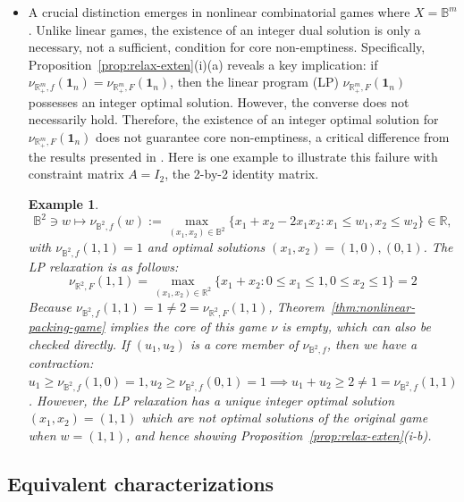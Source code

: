 \documentclass[11pt]{article}\usepackage[]{graphicx}\usepackage[]{xcolor}
\newtheorem{example}{Example}
\begin{document}
\begin{itemize}
Now Theorem~\ref{thm:nonlinear-partition-game} can be invoked to imply the Bondareva-Shapley theorem~\citep[Lemma 1]{shapley1967balanced}. 


\item A crucial distinction emerges in nonlinear combinatorial games where $X=\mathbb{B}^m$. Unlike linear games, the existence of an integer dual solution is only a necessary, not a sufficient, condition for core non-emptiness. Specifically, Proposition~\ref{prop:relax-exten}(i)(a) reveals a key implication: if $\nu_{\mathbb{R}^m_{+}, f}\left(\mathbf{1}_n\right)=\nu_{\mathbb{R}^m_{+}, F}\left(\mathbf{1}_n\right)$, then the linear program (LP) $\nu_{\mathbb{R}^m_{+}, F}\left(\mathbf{1}_n\right)$ possesses an integer optimal solution. However, the converse does not necessarily hold. Therefore, the existence of an integer optimal solution for $\nu_{\mathbb{R}^m_{+}, F}\left(\mathbf{1}_n\right)$ does not guarantee core non-emptiness, a critical difference from the results presented in \citep[Theorem 1]{deng1999algorithmic}. Here is one example to illustrate this failure with constraint matrix $A=I_2$, the 2-by-2 identity matrix. 
\begin{example}\label{exp:int-imlies-no-non-empty-core}
\[
\mathbb{B}^2\ni w\mapsto \nu_{\mathbb{B}^2,f}(w):=\max_{(x_1, x_2)\in\mathbb{B}^2}\{x_1+x_2-2x_1x_2: x_1\le w_1, x_2\le w_2\}\in\mathbb{R},
\]
with $\nu_{\mathbb{B}^2,f}(1,1)=1$ and optimal solutions $(x_1, x_2)=(1,0), (0,1)$. The LP relaxation is as follows: 
\[
\nu_{\mathbb{R}^2,F}(1,1)=\max_{(x_1, x_2)\in\mathbb{R}^2}\{x_1+x_2: 0\le x_1\le 1, 0\le x_2\le 1\}=2
\]
Because $\nu_{\mathbb{B}^2, f}(1,1)=1\ne 2=\nu_{\mathbb{R}^2, F}(1,1)$, Theorem~\ref{thm:nonlinear-packing-game} implies the core of this game $\nu$ is empty, which can also be checked directly. If $(u_1, u_2)$ is a core member of $\nu_{\mathbb{B}^2, f}$, then we have a contraction: $u_1\ge \nu_{\mathbb{B}^2, f} (1, 0)=1, u_2\ge \nu_{\mathbb{B}^2, f} (0, 1)=1\implies u_1+u_2\ge 2\ne 1=\nu_{\mathbb{B}^2, f} (1, 1)$. However, the LP relaxation has a unique integer optimal solution $(x_1, x_2)=(1,1)$ which are not optimal solutions of the original game when $w=(1,1)$, and hence showing Proposition~\ref{prop:relax-exten}(i-b).
\end{example}
\end{itemize}



\subsection{Equivalent characterizations}\label{subsec:equi-characterization-intermediate-game}
\end{document}
